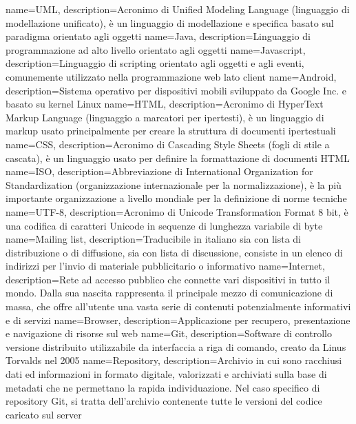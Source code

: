 {
	name=UML,
	description={Acronimo di Unified Modeling Language (linguaggio di modellazione unificato), è un linguaggio di modellazione e specifica basato sul paradigma
	orientato agli oggetti}
}
 {
	name=Java,
	description={Linguaggio di programmazione ad alto livello orientato agli oggetti}
}
 {
	name=Javascript,
	description={Linguaggio di scripting orientato agli oggetti e agli eventi, comunemente utilizzato nella programmazione web lato client}
}
 {
	name=Android,
	description={Sistema operativo per dispositivi mobili sviluppato da Google Inc. e basato su
	kernel Linux}
}
 {
	name=HTML,
	description={Acronimo di HyperText Markup Language (linguaggio a marcatori per ipertesti), è un linguaggio di markup usato principalmente per creare la struttura di documenti ipertestuali}
}
 {
	name=CSS,
	description={Acronimo di Cascading Style Sheets (fogli di stile a cascata), è un linguaggio
	usato per definire la formattazione di documenti HTML}
}
 {
	name=ISO,
	description={Abbreviazione di International Organization for Standardization (organizzazione
	internazionale per la normalizzazione), è la più importante organizzazione a livello mondiale
	per la definizione di norme tecniche}
}
 {
	name=UTF-8,
	description={Acronimo di Unicode Transformation Format 8 bit, è una codifica di caratteri Unicode in sequenze di lunghezza variabile di byte}
}
 {
	name=Mailing list,
	description={Traducibile in italiano sia con lista di distribuzione o di diffusione, sia con lista di discussione, consiste in un elenco di indirizzi per l'invio di materiale pubblicitario o informativo	}
}
 {
	name=Internet,
	description={Rete ad accesso pubblico che connette vari dispositivi in tutto il mondo.
	Dalla sua nascita rappresenta il principale mezzo di comunicazione di massa, che offre
	all'utente una vasta serie di contenuti potenzialmente informativi e di servizi}
}
 {
	name=Browser,
	description={Applicazione per recupero, presentazione e navigazione di risorse sul web}
}
 {
	name=Git,
	description={Software di controllo versione distribuito utilizzabile da interfaccia
	a riga di comando, creato da Linus Torvalds nel 2005}
}
 {
	name=Repository,
	description={Archivio in cui sono racchiusi dati ed informazioni in formato digitale,
	valorizzati e archiviati sulla base di metadati che ne permettano la rapida individuazione.
	Nel caso specifico di repository Git, si tratta dell'archivio contenente tutte le versioni
	del codice caricato sul server}
}
